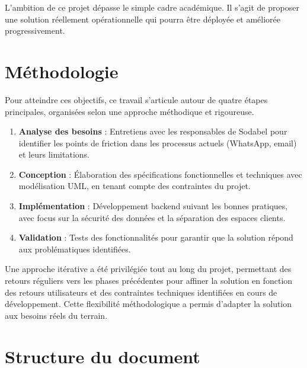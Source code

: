 \noindent L'ambition de ce projet dépasse le simple cadre académique. Il s'agit de proposer une solution réellement opérationnelle qui pourra être déployée et améliorée progressivement.


\section*{Méthodologie}

\noindent Pour atteindre ces objectifs, ce travail s'articule autour de quatre étapes principales, organisées selon une approche méthodique et rigoureuse.

\begin{enumerate}[leftmargin=*,itemsep=0.3em]
  \item \textbf{Analyse des besoins} : Entretiens avec les responsables de Sodabel pour identifier les points de friction dans les processus actuels (WhatsApp, email) et leurs limitations.

  \item \textbf{Conception} : Élaboration des spécifications fonctionnelles et techniques avec modélisation UML, en tenant compte des contraintes du projet.

  \item \textbf{Implémentation} : Développement backend suivant les bonnes pratiques, avec focus sur la sécurité des données et la séparation des espaces clients.

  \item \textbf{Validation} : Tests des fonctionnalités pour garantir que la solution répond aux problématiques identifiées.
\end{enumerate}

\begin{note}
Une approche itérative a été privilégiée tout au long du projet, permettant des retours réguliers vers les phases précédentes pour affiner la solution en fonction des retours utilisateurs et des contraintes techniques identifiées en cours de développement. Cette flexibilité méthodologique a permis d'adapter la solution aux besoins réels du terrain.
\end{note}

\section*{Structure du document}


